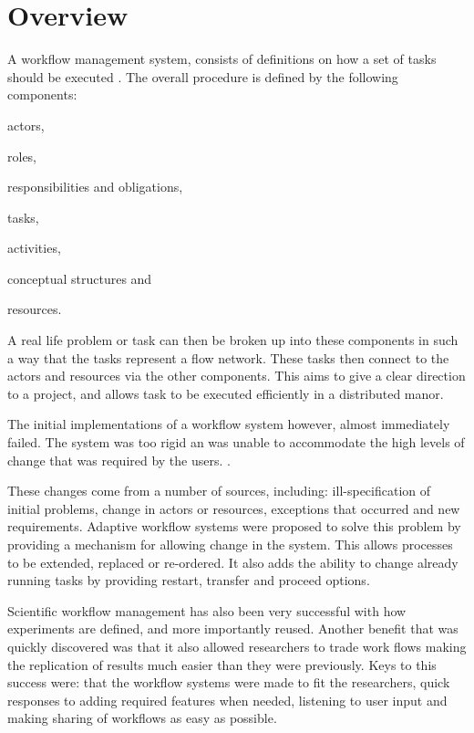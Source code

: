 \documentclass[11pt,twocolumn]{article}
\begin{document}
\section{Overview}
    A workflow management system, consists of definitions
    on how a set of tasks should be executed
    \cite{springerlink:10.1007/BF00136712,vanderAalst2002125}.
    The overall procedure is defined by the following
components: \begin{inparaenum}[(i)] \item actors,
    \item roles, \item responsibilities and
    obligations, \item tasks, \item activities,\item conceptual structures
    and \item resources.\end{inparaenum}

    A real life problem or task can then be broken up into these
    components in such a way that the tasks represent a flow
    network. These tasks then connect to the actors and resources
    via the other components\cite[p.~4]{Taylor:2006:WES:1196459}.
    This aims to give a clear direction to a project, and
    allows task to be executed efficiently in a distributed manor.

    The initial implementations of a workflow system
    however, almost immediately failed. The system was
    too rigid an was unable to accommodate the high levels
    of change that was required by the users.
    \cite{Suchman:1983:OPP:357442.357445}.

    These changes come from a number of sources, including:
    ill-specification of initial problems, change in actors
    or resources, exceptions that occurred and new requirements.
    Adaptive workflow systems were proposed to solve this
    problem by providing a mechanism for allowing change in
    the system. This allows processes to be extended,
    replaced or re-ordered. It also adds the ability to change
    already running tasks by providing restart, transfer and
    proceed options\cite{vanderAalst2002125}.

    Scientific workflow management has also been very
    successful with how experiments
    are defined, and more importantly reused. Another
    benefit that was quickly discovered was that it also
    allowed researchers to trade work flows making the
    replication of results much easier than they were
    previously. Keys to this success were: that the workflow
    systems were made to fit the researchers, quick responses
    to adding required features when needed, listening
    to user input and making sharing of workflows as easy as
    possible\cite{4721191}.
\end{document}
